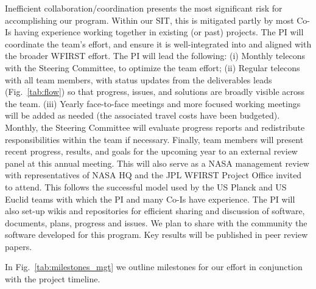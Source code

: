  Inefficient collaboration/coordination presents
the most significant risk for accomplishing our program. Within our
 SIT, this is mitigated partly by most Co-Is having experience
working together in existing (or past) projects. The PI will
coordinate the team's effort, and ensure it is well-integrated into
and aligned with the broader WFIRST effort. The PI will lead the following:
(i)  Monthly telecons with the Steering Committee, to optimize the team effort; (ii)
Regular telecons with all team members, with status updates
from the deliverables leads (Fig.~\ref{tab:flow}) so that progress, issues, and
solutions are broadly visible across the team. (iii) Yearly face-to-face
meetings and more focused working meetings will be added as
needed (the associated travel costs have been
budgeted). Monthly, the Steering Committee will evaluate progress
reports and redistribute responsibilities within the team if
necessary. Finally, team members will present %
recent progress, results, and goals for the upcoming year to
an external review panel at this annual meeting. This will also serve as a NASA management
review with representatives of NASA HQ and the JPL WFIRST Project
Office invited to attend. This follows the successful model used by
the US Planck and US Euclid teams with which the PI and many Co-Is have
experience. The PI will also set-up wikis and repositories for efficient
sharing and discussion of software, documents, plans, progress and
issues. We plan to share with the community the software developed for
this program. Key results will be published in peer review papers.

 In Fig.~\ref{tab:milestones_mgt} we outline milestones for
our effort in conjunction with the
\setlength\intextsep{-2pt}
project timeline.

